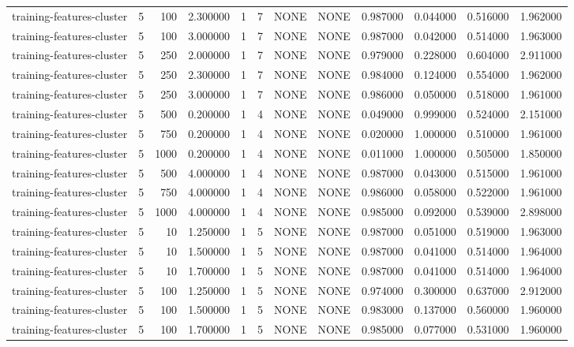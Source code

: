 \begin{tabular}{lrrrllllrrrr}
training-features-cluster & 5 & 100 & 2.300000 & 1 & 7 & NONE & NONE & 0.987000 & 0.044000 & 0.516000 & 1.962000 \\
training-features-cluster & 5 & 100 & 3.000000 & 1 & 7 & NONE & NONE & 0.987000 & 0.042000 & 0.514000 & 1.963000 \\
training-features-cluster & 5 & 250 & 2.000000 & 1 & 7 & NONE & NONE & 0.979000 & 0.228000 & 0.604000 & 2.911000 \\
training-features-cluster & 5 & 250 & 2.300000 & 1 & 7 & NONE & NONE & 0.984000 & 0.124000 & 0.554000 & 1.962000 \\
training-features-cluster & 5 & 250 & 3.000000 & 1 & 7 & NONE & NONE & 0.986000 & 0.050000 & 0.518000 & 1.961000 \\
training-features-cluster & 5 & 500 & 0.200000 & 1 & 4 & NONE & NONE & 0.049000 & 0.999000 & 0.524000 & 2.151000 \\
training-features-cluster & 5 & 750 & 0.200000 & 1 & 4 & NONE & NONE & 0.020000 & 1.000000 & 0.510000 & 1.961000 \\
training-features-cluster & 5 & 1000 & 0.200000 & 1 & 4 & NONE & NONE & 0.011000 & 1.000000 & 0.505000 & 1.850000 \\
training-features-cluster & 5 & 500 & 4.000000 & 1 & 4 & NONE & NONE & 0.987000 & 0.043000 & 0.515000 & 1.961000 \\
training-features-cluster & 5 & 750 & 4.000000 & 1 & 4 & NONE & NONE & 0.986000 & 0.058000 & 0.522000 & 1.961000 \\
training-features-cluster & 5 & 1000 & 4.000000 & 1 & 4 & NONE & NONE & 0.985000 & 0.092000 & 0.539000 & 2.898000 \\
training-features-cluster & 5 & 10 & 1.250000 & 1 & 5 & NONE & NONE & 0.987000 & 0.051000 & 0.519000 & 1.963000 \\
training-features-cluster & 5 & 10 & 1.500000 & 1 & 5 & NONE & NONE & 0.987000 & 0.041000 & 0.514000 & 1.964000 \\
training-features-cluster & 5 & 10 & 1.700000 & 1 & 5 & NONE & NONE & 0.987000 & 0.041000 & 0.514000 & 1.964000 \\
training-features-cluster & 5 & 100 & 1.250000 & 1 & 5 & NONE & NONE & 0.974000 & 0.300000 & 0.637000 & 2.912000 \\
training-features-cluster & 5 & 100 & 1.500000 & 1 & 5 & NONE & NONE & 0.983000 & 0.137000 & 0.560000 & 1.960000 \\
training-features-cluster & 5 & 100 & 1.700000 & 1 & 5 & NONE & NONE & 0.985000 & 0.077000 & 0.531000 & 1.960000 \\

\end{tabular}
